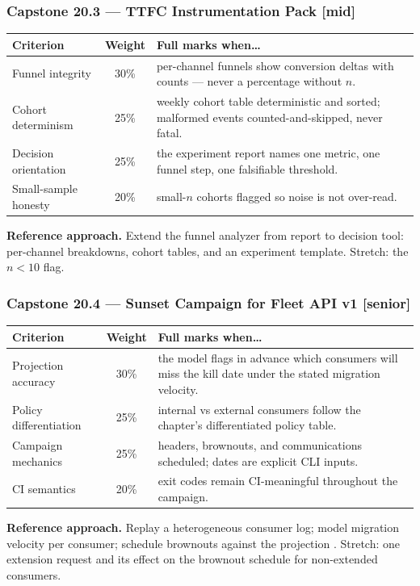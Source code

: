 \subsubsection*{Capstone 20.3 --- TTFC Instrumentation Pack [mid]}
\begin{center}\small
\begin{tabularx}{\textwidth}{l c X}
\toprule
\textbf{Criterion} & \textbf{Weight} & \textbf{Full marks when\ldots} \\
\midrule
Funnel integrity & 30\% & per-channel funnels show conversion deltas with counts --- never a percentage without $n$. \\
Cohort determinism & 25\% & weekly cohort table deterministic and sorted; malformed events counted-and-skipped, never fatal. \\
Decision orientation & 25\% & the experiment report names one metric, one funnel step, one falsifiable threshold. \\
Small-sample honesty & 20\% & small-$n$ cohorts flagged so noise is not over-read. \\
\bottomrule
\end{tabularx}
\end{center}
\textbf{Reference approach.} Extend the funnel analyzer from report to
decision tool: per-channel breakdowns, cohort tables, and an experiment
template. Stretch: the $n < 10$ flag.

\subsubsection*{Capstone 20.4 --- Sunset Campaign for Fleet API v1 [senior]}
\begin{center}\small
\begin{tabularx}{\textwidth}{l c X}
\toprule
\textbf{Criterion} & \textbf{Weight} & \textbf{Full marks when\ldots} \\
\midrule
Projection accuracy & 30\% & the model flags in advance which consumers will miss the kill date under the stated migration velocity. \\
Policy differentiation & 25\% & internal vs external consumers follow the chapter's differentiated policy table. \\
Campaign mechanics & 25\% & headers, brownouts, and communications scheduled; dates are explicit CLI inputs. \\
CI semantics & 20\% & exit codes remain CI-meaningful throughout the campaign. \\
\bottomrule
\end{tabularx}
\end{center}
\textbf{Reference approach.} Replay a heterogeneous consumer log; model
migration velocity per consumer; schedule brownouts against the projection
\cite{rfc8594}. Stretch: one extension request and its effect on the
brownout schedule for non-extended consumers.

